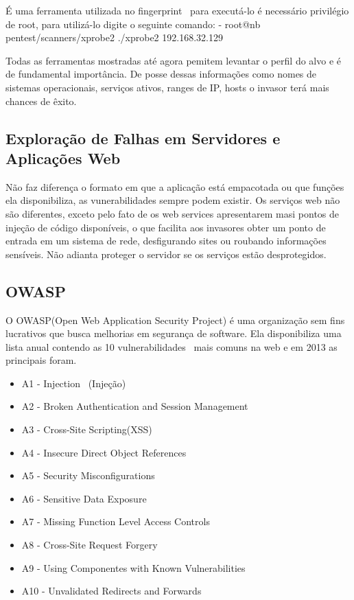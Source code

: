 É uma ferramenta utilizada no fingerprint~\cite{giavaroto} para executá-lo é necessário privilégio de root, para utilizá-lo digite o seguinte comando:
- root@nb pentest/scanners/xprobe2 ./xprobe2 192.168.32.129

Todas as ferramentas mostradas até agora pemitem levantar o perfil do alvo e é de fundamental importância. De posse dessas informações como nomes de sistemas operacionais, serviços ativos, ranges de IP, hosts o invasor terá mais chances de êxito.

\subsection{Exploração de Falhas em Servidores e Aplicações Web}

Não faz diferença o formato em que a aplicação está empacotada ou que funções ela disponibiliza, as vunerabilidades sempre podem existir. Os serviços web não são diferentes, exceto pelo fato de os web services apresentarem masi pontos de injeção de código  disponíveis, o que facilita aos invasores obter um ponto de entrada em um sistema de rede, desfigurando sites ou roubando informações sensíveis. Não adianta proteger o servidor se os serviços estão desprotegidos.
\subsection{OWASP}
O OWASP(Open Web Application Security Project) é uma organização sem fins lucrativos que busca melhorias em segurança de software. Ela disponibiliza uma lista anual contendo as 10 vulnerabilidades~\cite{broad} mais comuns na web e em 2013 as principais foram.
\begin{itemize}
\item A1 - Injection~\cite{broad}  (Injeção)
\item A2 - Broken Authentication and Session Management ~\cite{broad} 
\item A3 - Cross-Site Scripting(XSS)~\cite{broad} 
\item A4 - Insecure Direct Object References~\cite{broad} 
\item A5 - Security Misconfigurations~\cite{broad} 
\item A6 - Sensitive Data Exposure~\cite{broad} 
\item A7 - Missing Function Level Access Controls~\cite{broad} 
\item A8 - Cross-Site Request Forgery~\cite{broad} 
\item A9 - Using Componentes with Known Vulnerabilities~\cite{broad} 
\item A10 - Unvalidated Redirects and Forwards~\cite{broad} 
\end{itemize}

